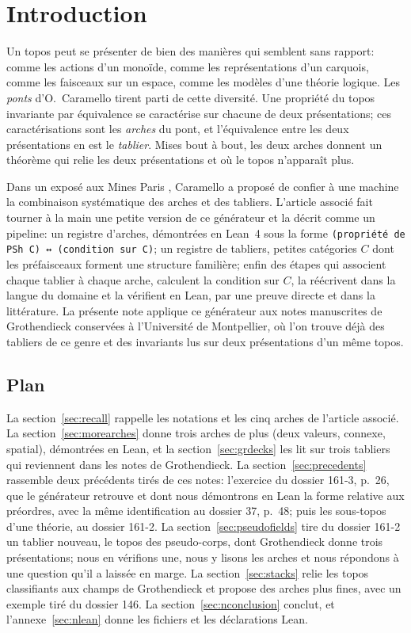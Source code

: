 \section{Introduction}\label{sec:nintro}

Un topos peut se présenter de bien des manières qui semblent sans rapport: comme les actions d'un monoïde, comme les représentations d'un carquois, comme les faisceaux sur un espace, comme les modèles d'une théorie logique. Les \emph{ponts} d'O.~Caramello \cite{caramello-unification,caramello-tst} tirent parti de cette diversité. Une propriété du topos invariante par équivalence se caractérise sur chacune de deux présentations; ces caractérisations sont les \emph{arches} du pont, et l'équivalence entre les deux présentations en est le \emph{tablier}. Mises bout à bout, les deux arches donnent un théorème qui relie les deux présentations et où le topos n'apparaît plus.

Dans un exposé aux Mines Paris \cite{caramello-mines}, Caramello a proposé de confier à une machine la combinaison systématique des arches et des tabliers. L'article associé \cite{bridges-generator} fait tourner à la main une petite version de ce générateur et la décrit comme un pipeline: un registre d'arches, démontrées en Lean~4 sous la forme \texttt{(propriété de PSh C) ↔ (condition sur C)}; un registre de tabliers, petites catégories $C$ dont les préfaisceaux forment une structure familière; enfin des étapes qui associent chaque tablier à chaque arche, calculent la condition sur $C$, la réécrivent dans la langue du domaine et la vérifient en Lean, par une preuve directe et dans la littérature. La présente note applique ce générateur aux notes manuscrites de Grothendieck conservées à l'Université de Montpellier, où l'on trouve déjà des tabliers de ce genre et des invariants lus sur deux présentations d'un même topos.

\subsection*{Plan}

La section~\ref{sec:recall} rappelle les notations et les cinq arches de l'article associé. La section~\ref{sec:morearches} donne trois arches de plus (deux valeurs, connexe, spatial), démontrées en Lean, et la section~\ref{sec:grdecks} les lit sur trois tabliers qui reviennent dans les notes de Grothendieck. La section~\ref{sec:precedents} rassemble deux précédents tirés de ces notes: l'exercice du dossier 161-3, p.~26, que le générateur retrouve et dont nous démontrons en Lean la forme relative aux préordres, avec la même identification au dossier 37, p.~48; puis les sous-topos d'une théorie, au dossier 161-2. La section~\ref{sec:pseudofields} tire du dossier 161-2 un tablier nouveau, le topos des pseudo-corps, dont Grothendieck donne trois présentations; nous en vérifions une, nous y lisons les arches et nous répondons à une question qu'il a laissée en marge. La section~\ref{sec:stacks} relie les topos classifiants aux champs de Grothendieck et propose des arches plus fines, avec un exemple tiré du dossier 146. La section~\ref{sec:nconclusion} conclut, et l'annexe~\ref{sec:nlean} donne les fichiers et les déclarations Lean.
